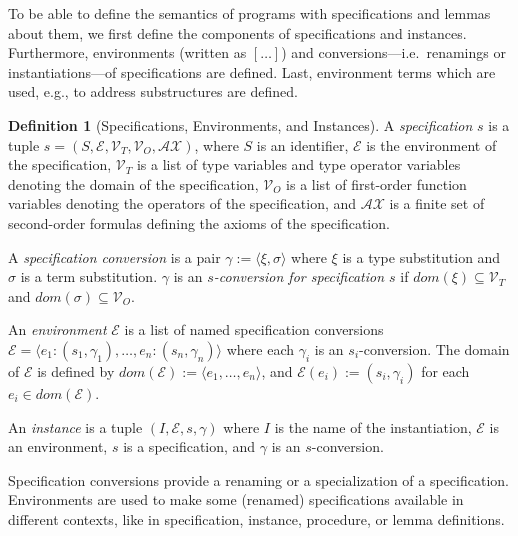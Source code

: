 \documentclass{article}
\theoremstyle{remark}
\theoremstyle{definition}
\newtheorem{definition}[theorem]{Definition}
\newcommand{\vars}{\mathcal{V}}
\newcommand{\env}{\mathcal{E}}
\newcommand{\dom}{\mathit{dom}}
\newcommand{\Ax}{\mathcal{AX}}
\begin{document}
To be able to define the semantics of programs with specifications and lemmas about them, we first define the
components of specifications and instances. Furthermore, environments (written as $[\ldots]$) and conversions---i.e.\
renamings or instantiations---of specifications are defined. Last, environment terms which are used, e.g., to address
substructures are defined.


\begin{definition}[Specifications, Environments, and Instances]
A \emph{specification} $s$ is a tuple $s=(S, \env, \vars_T, \vars_{O}, \Ax )$, where $S$ is an identifier, $\env$ is
the environment of the specification, $\vars_T$ is a list of type variables and type operator variables denoting the
domain of the specification, $\vars_O$ is a list of first-order function variables denoting the operators of the
specification, and $\Ax$ is a finite set of second-order formulas defining the axioms of the specification.

A \emph{specification conversion} is a pair $\gamma := \langle\xi,\sigma\rangle$ where $\xi$ is a type substitution and
$\sigma$ is a term substitution. $\gamma$ is an \emph{$s$-conversion for specification $s$} if $\dom(\xi) \subseteq
\vars_T$ and $\dom(\sigma) \subseteq \vars_O$.

An \emph{environment} $\env$ is a list of named specification conversions $\env = \langle e_1 :
(s_1,\gamma_1),\ldots,e_n : (s_n,\gamma_n) \rangle$ where each $\gamma_i$ is an $s_i$-conversion. The domain of $\env$
is defined by $\dom(\env) := \langle e_1,\ldots,e_n \rangle$, and $\env(e_i) := (s_i,\gamma_i)$ for each $e_i \in
\dom(\env)$.

An \emph{instance} is a tuple $(I,\env,s,\gamma)$ where $I$ is the name of the instantiation, $\env$ is an environment,
$s$ is a specification, and $\gamma$ is an $s$-conversion.
\end{definition}

\noindent Specification conversions provide a renaming or a specialization of a specification. Environments are used to
make some (renamed) specifications available in different contexts, like in specification, instance, procedure, or
lemma definitions.
\end{document}
